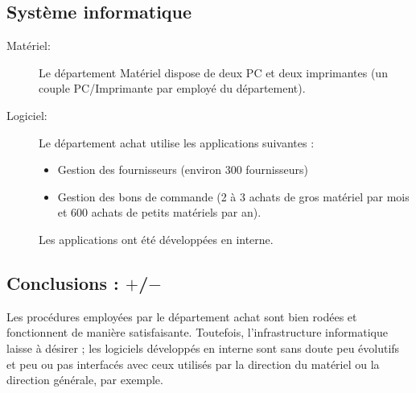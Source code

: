 \subsection{Système informatique}

\begin{description}
    \item [Matériel:]\el
Le département Matériel dispose de deux PC et deux imprimantes (un couple
PC/Imprimante par employé du département).

    \item [Logiciel:]\el
Le département achat utilise les applications suivantes :
    \begin{itemize}
\item Gestion des fournisseurs (environ 300 fournisseurs)
\item Gestion des bons de commande (2 à 3 achats de gros matériel par mois
        et 600 achats de petits matériels par an).
    \end{itemize}

Les applications ont été développées en interne.

\end{description}

\subsection{Conclusions : $+$/$-$}

Les procédures employées par le département achat sont bien rodées et
fonctionnent de manière satisfaisante. Toutefois, l'infrastructure
informatique laisse à désirer ; les logiciels développés en interne sont
sans doute peu évolutifs et peu ou pas interfacés avec ceux utilisés par la
direction du matériel ou la direction générale, par exemple.

\vfil
\pagebreak
